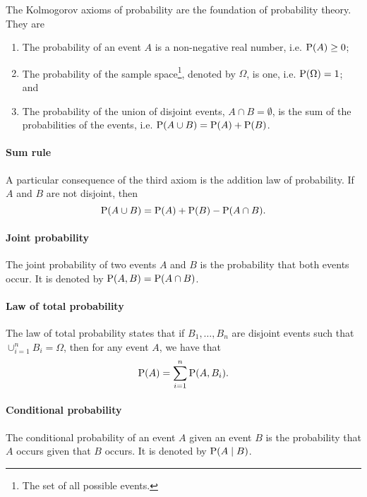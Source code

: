 The Kolmogorov axioms of probability are the foundation of probability theory.
They are
\begin{enumerate}
  \item The probability of an event $A$ is a non-negative real number, i.e. $\operatorname{P}(A) \geq 0$;
  \item The probability of the sample space\footnote{The set of all possible
    events.}, denoted by $\Omega$, is one, i.e. $\operatorname{P}(\Omega) = 1$; and
  \item The probability of the union of disjoint events, $A \cap B = \emptyset$, is
    the sum of the probabilities of the events, i.e. $\operatorname{P}(A \cup B) = \operatorname{P}(A) + \operatorname{P}(B)$.
\end{enumerate}

\paragraph{Sum rule}
A particular consequence of the third axiom is the addition law of probability.
If $A$ and $B$ are not disjoint, then
\begin{equation*}
  \operatorname{P}(A \cup B) = \operatorname{P}(A) + \operatorname{P}(B) - \operatorname{P}(A \cap B)\text{.}
\end{equation*}

\paragraph{Joint probability}

The joint probability of two events $A$ and $B$ is the probability that both events
occur.  It is denoted by $\operatorname{P}(A, B) = \operatorname{P}(A \cap B)$.

\paragraph{Law of total probability}

The law of total probability states that if $B_1, \dots, B_n$ are disjoint events
such that $\cup_{i = 1}^n B_i = \Omega$, then for any event $A$, we have that
$$\operatorname{P}(A) = \sum_{i = 1}^n \operatorname{P}(A, B_i)\text{.}$$

\paragraph{Conditional probability}

The conditional probability of an event $A$ given an event $B$ is the probability
that $A$ occurs given that $B$ occurs.  It is denoted by $\operatorname{P}(A \mid B)$.

